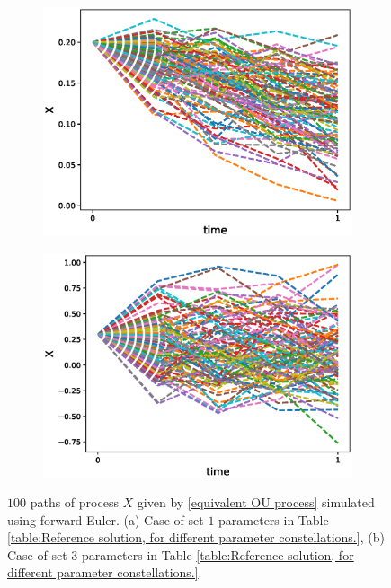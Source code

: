 \begin{enumerate}
\FloatBarrier
\begin{figure}[htb]
	\centering %
	\begin{subfigure}{0.4\textwidth}
		\includegraphics[width=\linewidth]{./figures/Heston_single_call_smooth_vol/paths_trajectory/paths_smooth_vol_scheme_set1_N4_X}
		\caption{}
		\label{fig:1}
	\end{subfigure}\hfil %
	\begin{subfigure}{0.4\textwidth}
		\includegraphics[width=\linewidth]{./figures/Heston_single_call_smooth_vol/paths_trajectory/paths_smooth_vol_scheme_set3_N4_X}
		\caption{}
		\label{fig:2}
	\end{subfigure}\hfil %
	\caption{$100$ paths of process $X$ given by \eqref{equivalent OU process} simulated using forward Euler. (a) Case of set $1$ parameters in Table \ref{table:Reference solution, for different parameter constellations.}, (b) Case of set $3$ parameters in Table \ref{table:Reference solution, for different parameter constellations.}.}
	\label{fig:paths of process $X$ simulated using forward Euler}	
\end{figure}
\FloatBarrier


\end{enumerate}
